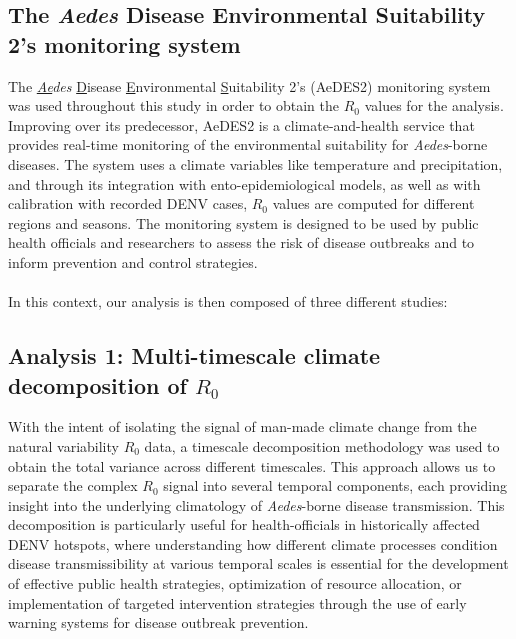 \documentclass[10pt,twocolumn]{wlscirep}
\begin{document}
\subsection{The \textit{Aedes} Disease Environmental Suitability 2's monitoring system} \label{sec-methods-aedes2}

The \textit{\underline{Ae}des} \underline{D}isease \underline{E}nvironmental \underline{S}uitability 2's (AeDES2) monitoring system\cite{guerra_2025} was used throughout this study in order to obtain the $R_0$ values for the analysis. Improving over its predecessor\cite{munoz_2020b}, AeDES2 is a climate-and-health service that provides real-time monitoring of the environmental suitability for \textit{Aedes}-borne diseases. The system uses a climate variables like temperature and precipitation, and through its integration with ento-epidemiological models, as well as with calibration with recorded DENV cases, $R_0$ values are computed for different regions and seasons. The monitoring system is designed to be used by public health officials and researchers to assess the risk of disease outbreaks and to inform prevention and control strategies.
\\
\\
In this context, our analysis is then composed of three different studies:

\subsection{Analysis 1: Multi-timescale climate decomposition of $R_0$} \label{sec-methods-1-analysis}

With the intent of isolating the signal of man-made climate change from the natural variability $R_0$ data, a timescale decomposition methodology was used to obtain the total variance across different timescales. This approach allows us to separate the complex $R_0$ signal into several temporal components, each providing insight into the underlying climatology of \textit{Aedes}-borne disease transmission. This decomposition is particularly useful for health-officials in historically affected DENV hotspots, where understanding how different climate processes condition disease transmissibility at various temporal scales is essential for the development of effective public health strategies, optimization of resource allocation, or implementation of targeted intervention strategies through the use of early warning systems for disease outbreak prevention\cite{thomson_2018a, munoz_2016}.
\end{document}
